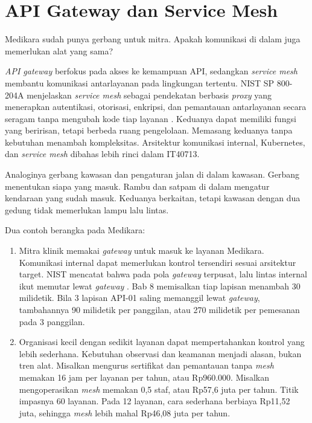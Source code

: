 \section{API Gateway dan Service Mesh}

Medikara sudah punya gerbang untuk mitra. Apakah komunikasi di dalam juga memerlukan alat yang sama?

\textit{API gateway} berfokus pada akses ke kemampuan API, sedangkan \textit{service mesh} membantu komunikasi
antarlayanan pada lingkungan tertentu. NIST SP 800-204A menjelaskan \textit{service mesh} sebagai pendekatan berbasis
\textit{proxy} yang menerapkan autentikasi, otorisasi, enkripsi, dan pemantauan antarlayanan secara seragam tanpa
mengubah kode tiap layanan \cite{c10-nist-sp800-204a}. Keduanya dapat memiliki fungsi yang beririsan, tetapi berbeda
ruang pengelolaan. Memasang keduanya tanpa kebutuhan menambah kompleksitas. Arsitektur komunikasi internal, Kubernetes,
dan \textit{service mesh} dibahas lebih rinci dalam IT40713.

Analoginya gerbang kawasan dan pengaturan jalan di dalam kawasan. Gerbang menentukan siapa yang masuk. Rambu dan satpam
di dalam mengatur kendaraan yang sudah masuk. Keduanya berkaitan, tetapi kawasan dengan dua gedung tidak memerlukan
lampu lalu lintas.

Dua contoh berangka pada Medikara:
\begin{enumerate}
  \item Mitra klinik memakai \textit{gateway} untuk masuk ke layanan Medikara. Komunikasi internal dapat memerlukan
        kontrol tersendiri sesuai arsitektur target. NIST mencatat bahwa pada pola \textit{gateway} terpusat, lalu
        lintas internal ikut memutar lewat \textit{gateway} \cite{nist-sp800-228}. Bab 8 memisalkan tiap lapisan
        menambah 30 milidetik. Bila 3 lapisan API-01 saling memanggil lewat \textit{gateway}, tambahannya 90 milidetik
        per panggilan, atau 270 milidetik per pemesanan pada 3 panggilan.
  \item Organisasi kecil dengan sedikit layanan dapat mempertahankan kontrol yang lebih sederhana. Kebutuhan observasi
        dan keamanan menjadi alasan, bukan tren alat. Misalkan mengurus sertifikat dan pemantauan tanpa \textit{mesh}
        memakan 16 jam per layanan per tahun, atau Rp960.000. Misalkan mengoperasikan \textit{mesh} memakan 0,5 staf,
        atau Rp57,6 juta per tahun. Titik impasnya 60 layanan. Pada 12 layanan, cara sederhana berbiaya Rp11,52 juta,
        sehingga \textit{mesh} lebih mahal Rp46,08 juta per tahun.
\end{enumerate}


